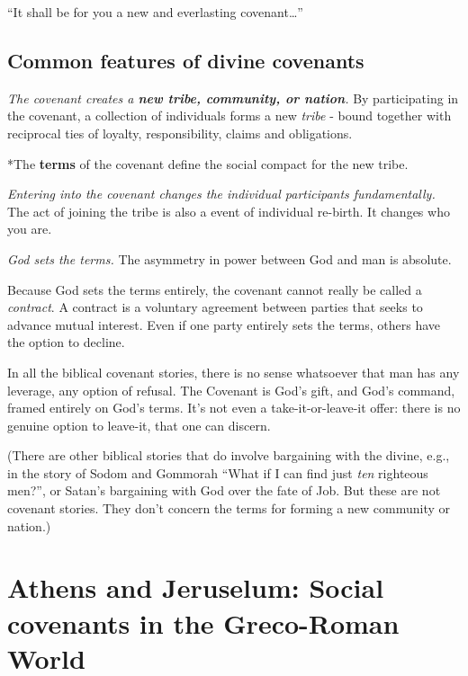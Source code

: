 \documentclass[
]{book}
\begin{document}
``It shall be for you a new and everlasting covenant\ldots{}''

\hypertarget{common-features-of-divine-covenants}{%
\section{Common features of divine covenants}\label{common-features-of-divine-covenants}}

\emph{The covenant creates a \textbf{new tribe, community, or nation}.} By participating in the covenant, a collection of individuals forms a new \emph{tribe} - bound together with reciprocal ties of loyalty, responsibility, claims and obligations.

*The \textbf{terms} of the covenant define the social compact for the new tribe.

\emph{Entering into the covenant changes the individual participants fundamentally.} The act of joining the tribe is also a event of individual re-birth. It changes who you are.

\emph{God sets the terms.} The asymmetry in power between God and man is absolute.

Because God sets the terms entirely, the covenant cannot really be called a \emph{contract}. A contract is a voluntary agreement between parties that seeks to advance mutual interest. Even if one party entirely sets the terms, others have the option to decline.

In all the biblical covenant stories, there is no sense whatsoever that man has any leverage, any option of refusal. The Covenant is God's gift, and God's command, framed entirely on God's terms. It's not even a take-it-or-leave-it offer: there is no genuine option to leave-it, that one can discern.

(There are other biblical stories that do involve bargaining with the divine, e.g., in the story of Sodom and Gommorah ``What if I can find just \emph{ten} righteous men?'', or Satan's bargaining with God over the fate of Job. But these are not covenant stories. They don't concern the terms for forming a new community or nation.)

\hypertarget{athens-and-jeruselum-social-covenants-in-the-greco-roman-world}{%
\chapter{Athens and Jeruselum: Social covenants in the Greco-Roman World}\label{athens-and-jeruselum-social-covenants-in-the-greco-roman-world}}
\end{document}
